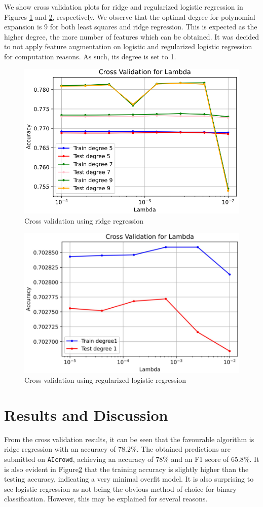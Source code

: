 \documentclass[10pt,conference,compsocconf]{IEEEtran}
\begin{document}
We show cross validation plots for ridge and regularized logistic regression in Figures \ref{fig:ridge} and \ref{fig:logistic}, respectively. We observe that the optimal degree for polynomial expansion is 9 for both least squares and ridge regression. This is expected as the higher degree, the more number of features which can be obtained. It was decided to not apply feature augmentation on logistic and regularized logistic regression for computation reasons. As such, its degree is set to 1.

\begin{figure}
  \centering\includegraphics[width=0.8\linewidth]{ridge_reg.png}
  \caption{Cross validation using ridge regression}
  \label{fig:ridge}
\end{figure}

\begin{figure}
  \centering\includegraphics[width=0.8\linewidth]{reg_logist.png}
  \caption{Cross validation using regularized logistic regression}
  \label{fig:logistic}
\end{figure}


\section{Results and Discussion}
\label{sec:results}
From the cross validation results, it can be seen that the favourable algorithm is ridge regression with an accuracy of 78.2\%. The obtained predictions are submitted on \texttt{AIcrowd}, achieving an accuracy of 78\% and an F1 score of 65.8\%. It is also evident in Figure\ref{fig:logistic} that the training accuracy is slightly higher than the testing accuracy, indicating a very minimal overfit model. It is also surprising to see logistic regression as not being the obvious method of choice for binary classification. However, this may be explained for several reasons.
\end{document}
